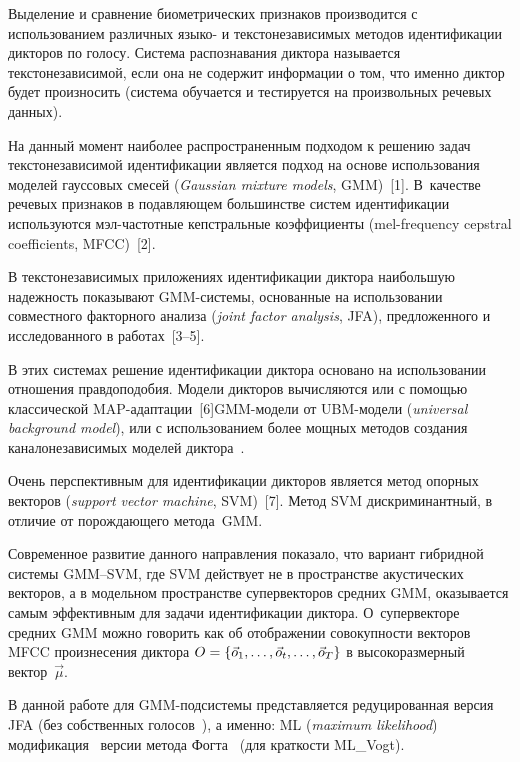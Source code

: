 \begin{multicols}{2}
  Выделение и сравнение биометрических признаков производится с 
использованием различных язы\-ко- и текстонезависимых методов идентификации 
дикторов по голосу. Система распознавания диктора называется 
текстонезависимой, если она не содержит информации о том, что именно диктор 
будет произносить (система обучается и тестируется на произвольных речевых 
данных).
  
  На данный момент наиболее распространенным подходом к решению задач 
текстонезависимой идентификации является подход на основе использования 
моделей гауссовых смесей (\textit{Gaussian mixture models}, GMM)~[1]. 
В~качестве речевых признаков в подавляющем большинстве систем 
идентификации используются мэл-час\-тот\-ные кепстральные коэффициенты 
(mel-frequency cepstral coefficients, MFCC)~[2]. 
  
  В текстонезависимых приложениях идентификации диктора наибольшую 
надежность показывают GMM-сис\-те\-мы, основанные на использовании 
совместного факторного анализа (\textit{joint factor analysis}, JFA), предложенного и 
исследованного в работах~[3--5].
  
  В этих системах решение идентификации диктора основано на использовании 
отношения правдоподобия. Модели дикторов вычисляются или с по\-мощью 
классической MAP-адап\-та\-ции~[6]\linebreak GMM-мо\-де\-ли от 
UBM-мо\-де\-ли (\textit{universal background model}), или с использованием более 
мощных методов создания каналонезависимых моделей дик\-то\-ра~\cite{3b, 4b}.
{ %

}
  
  Очень перспективным для идентификации дикторов является метод опорных 
векторов (\textit{support vector machine}, SVM)~[7]. Метод SVM дискриминантный, 
в отличие от порождающего метода~GMM. 
  
  Современное развитие данного направления показало, что вариант гибридной 
системы GMM--SVM, где SVM действует не в пространстве акус\-ти\-че\-ских 
векторов, а в модельном пространстве супервекторов средних GMM, 
оказывается самым эффективным для задачи идентификации диктора. 
О~супервекторе средних GMM можно говорить как об отображении 
совокупности векторов MFCC произнесения диктора $O\hm=\{\vec{o}_1,\ldots , 
\vec{o}_t, \ldots ,\vec{o}_T\}$ в высокоразмерный вектор~$\vec\mu$.
  
  В данной работе для GMM-под\-сис\-те\-мы представляется редуцированная 
версия JFA (без собственных голосов~\cite{3b}), а именно: ML (\textit{maximum 
likelihood}) модификация~\cite{9b} версии метода Фогта~\cite{4b} (для 
краткости ML\_Vogt). 
  

\end{multicols}
